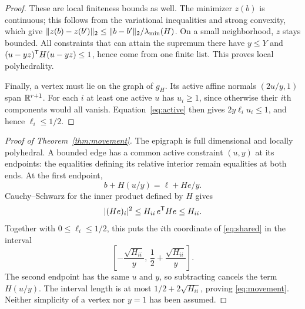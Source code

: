 \begin{proof}
These are local finiteness bounds as well. The minimizer $z(b)$ is continuous; this follows from the variational inequalities and strong convexity, which give
$\lVert z(b)-z(b')\rVert_2\le\lVert b-b'\rVert_2/\lambda_{\min}(H)$.
On a small neighborhood, $z$ stays bounded. All constraints that can attain the supremum there have $y\le Y$ and $(u-yz)^{\mathsf T} H(u-yz)\le1$, hence come from one finite list. This proves local polyhedrality.

Finally, a vertex must lie on the graph of $g_H$. Its active affine normals $(2u/y,1)$ span $\mathbb R^{r+1}$. For each $i$ at least one active $u$ has $u_i\ge1$, since otherwise their $i$th components would all vanish. Equation~\eqref{eq:active} then gives
$2y\ell_i u_i\le1$, and hence $\ell_i\le1/2$.
\end{proof}

\begin{proof}[Proof of Theorem~\ref{thm:movement}]
The epigraph is full dimensional and locally polyhedral. A bounded edge has a common active constraint $(u,y)$ at its endpoints: the equalities defining its relative interior remain equalities at both ends. At the first endpoint,
\begin{equation}\label{eq:shared}
 b+H(u/y)=\ell+He/y.
\end{equation}
Cauchy--Schwarz for the inner product defined by $H$ gives
\[
 |(He)_i|^2\le H_{ii}\,e^{\mathsf T} He\le H_{ii}.
\]
Together with $0\le\ell_i\le1/2$, this puts the $i$th coordinate of \eqref{eq:shared} in the interval
\[
 \left[-\frac{\sqrt{H_{ii}}}{y},\,
       \frac12+\frac{\sqrt{H_{ii}}}{y}\right].
\]
The second endpoint has the same $u$ and $y$, so subtracting cancels the term $H(u/y)$. The interval length is at most $1/2+2\sqrt{H_{ii}}$, proving \eqref{eq:movement}. Neither simplicity of a vertex nor $y=1$ has been assumed.
\end{proof}

